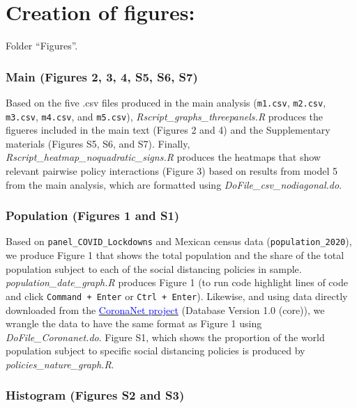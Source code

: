 \documentclass{article}
\begin{document}
\section*{Creation of figures:}


Folder ``Figures''.

\subsubsection*{Main (Figures 2, 3, 4, S5, S6, S7)}

Based on the five .csv files produced in the main analysis (\texttt{m1.csv}, \texttt{m2.csv}, \texttt{m3.csv}, \texttt{m4.csv}, and \texttt{m5.csv}), \textit{Rscript\_graphs\_threepanels.R} produces the figueres included in the main text (Figures 2 and 4) and the Supplementary materials (Figures S5, S6, and S7). Finally, \textit{Rscript\_heatmap\_noquadratic\_signs.R} produces the heatmaps that show relevant pairwise policy interactions (Figure 3) based on results from model 5 from the main analysis, which are formatted using
\textit{DoFile\_csv\_nodiagonal.do}.

\subsubsection*{Population (Figures 1 and S1)}

Based on \texttt{panel\_COVID\_Lockdowns} and Mexican census data (\texttt{population\_2020}), we produce Figure 1 that shows the total population and the share of the total population subject to each of the social distancing policies in sample. \textit{population\_date\_graph.R} produces Figure 1 (to run code highlight lines of code and click \texttt{Command + Enter} or \texttt{Ctrl + Enter}). Likewise, and using data directly downloaded from the \href{https://www.coronanet-project.org/}{\textcolor{blue}{CoronaNet project}} (Database Version 1.0 (core)), we wrangle the data to have the same format as Figure 1 using \textit{DoFile\_Coronanet.do}. Figure S1, which shows the proportion of the world population subject to specific social distancing policies is produced by \textit{policies\_nature\_graph.R}.

\subsubsection*{Histogram (Figures S2 and S3)}
\end{document}
